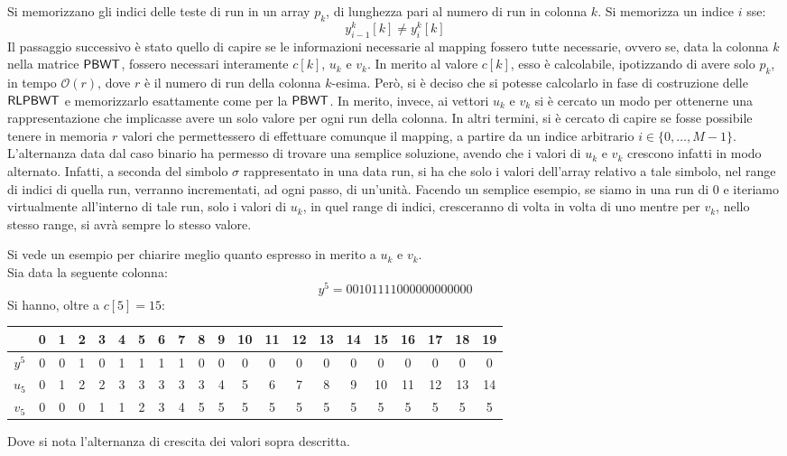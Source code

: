 Si memorizzano gli indici delle teste di run in un array $p_k$, di lunghezza
pari al numero di run in colonna $k$. Si memorizza un indice $i$ sse:
\begin{equation}
  \label{eq:naive1}
  y_{i-1}^k[k]\neq y_i^k[k]
\end{equation}
Il passaggio successivo è stato quello di capire se le informazioni necessarie
al mapping fossero tutte necessarie, ovvero se, data la colonna $k$
nella matrice $\mbox{\rm {\sf PBWT}}$, fossero necessari interamente $c[k]$, $u_k$ e $v_k$. In
merito 
al valore $c[k]$, esso è calcolabile, ipotizzando di avere solo $p_k$, in
tempo $\mathcal{O}(r)$, dove $r$ è 
il numero di run della colonna $k$-esima. Però, si è deciso che si potesse
calcolarlo 
in fase di costruzione delle $\mbox{\rm {\sf RLPBWT}}$ e memorizzarlo esattamente come per
la $\mbox{\rm {\sf PBWT}}$. In merito, invece, ai vettori $u_k$ e $v_k$ si è cercato un modo
per ottenerne una rappresentazione che implicasse avere un solo valore per ogni
run della colonna. In altri termini, si è cercato di capire se fosse possibile
tenere in memoria $r$ valori che permettessero di effettuare comunque il
mapping, a partire da un indice arbitrario $i\in\{0,\ldots,M-1\}$. L'alternanza
data dal caso binario ha permesso di trovare una 
semplice soluzione, avendo che i valori di $u_k$ e $v_k$ crescono infatti in
modo 
alternato. Infatti, a seconda del simbolo $\sigma$ rappresentato in una data
run, si ha che solo i valori dell'array relativo a tale simbolo, nel range di
indici di quella run, verranno incrementati, ad ogni passo, di un'unità. Facendo
un semplice esempio, se siamo in una run di 0 e iteriamo 
virtualmente all'interno di tale run, solo i valori di $u_k$, in quel
range di indici, cresceranno di volta in volta di uno mentre per $v_k$, nello
stesso range, si avrà sempre lo stesso valore.
\begin{esempio}
  Si vede un esempio per chiarire meglio quanto espresso in merito a $u_k$ e
  $v_k$.\\
  Sia data la seguente colonna:
  \[y^5=00101111000000000000\]
  Si hanno, oltre a $c[5]=15$:
  \begin{table}[H]
    \footnotesize
    \centering
    \begin{tabular}{c||cc|c|c|cccc|cccccccccccc}
      & 0 & 1 & 2 & 3 & 4 & 5 & 6 & 7 & 8 & 9 & 10 & 11 & 12 & 13 & 14 & 15 & 16
      & 17 & 18 & 19\\
      \hline
      \hline
      $y^5$ & 0 & 0 & 1 & 0 & 1 & 1 & 1 & 1 & 0 & 0 & 0 & 0 & 0 & 0 & 0 & 0 & 0
      & 0 & 0 & 0\\
      \hline
      \hline
      $u_5$ & 0 & 1 & 2 & 2 & 3 & 3 & 3 & 3 & 3 & 4 & 5 & 6 & 7 & 8 & 9 & 10
      & 11 & 12 & 13 & 14\\
      \hline
      $v_5$ & 0 & 0 & 0 & 1 & 1 & 2 & 3 & 4 & 5 & 5 & 5 & 5 & 5 & 5 & 5 & 5 & 5
      & 5 & 5 & 5
    \end{tabular}
  \end{table}
  Dove si nota l'alternanza di crescita dei valori sopra descritta.
\end{esempio}

